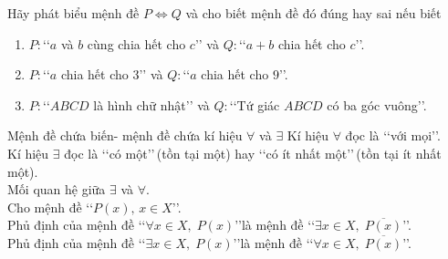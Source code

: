 \begin{bt}
	Hãy phát biểu mệnh đề $P\Leftrightarrow Q$ và cho biết mệnh đề đó đúng hay sai nếu biết
	\begin{enumerate}
		\item $P\colon $\lq\lq $a$ và $b$ cùng chia hết cho $c$\rq\rq\text{} và $Q\colon $\lq\lq $a+b$ chia hết cho $c$\rq\rq.
		\item $P\colon $\lq\lq $a$ chia hết cho $3$\rq\rq\text{} và $Q\colon $\lq\lq $a$ chia hết cho $9$\rq\rq.
		\item $P\colon $\lq\lq $ABCD$ là hình chữ nhật\rq\rq\text{} và $Q\colon $\lq\lq Tứ giác $ABCD$ có ba góc vuông\rq\rq.
	\end{enumerate}
\end{bt}

\begin{dang}{Mệnh đề chứa biến- mệnh đề chứa kí hiệu $\forall$ và $\exists$}
	Kí hiệu $\forall$ đọc là \lq \lq với mọi\rq \rq.\\
	Kí hiệu $\exists$ đọc là \lq \lq có một\rq \rq \,(tồn tại một) hay \lq \lq có ít nhất một\rq \rq\,(tồn tại ít nhất một).\\
	Mối quan hệ giữa $\exists$ và $\forall$.\\
	Cho mệnh đề \lq \lq $P(x),\, x \in X$\rq \rq.\\
	Phủ định của mệnh đề \lq \lq $ \forall x \in X,\;P(x)$\rq \rq \;là mệnh đề \lq \lq $\exists x \in X,\;\overline{P(x)}$\rq \rq.\\
	Phủ định của mệnh đề \lq \lq $ \exists x \in X,\;P(x)$\rq \rq \;là mệnh đề \lq \lq $ \forall x \in X,\;\overline{P(x)}$\rq \rq.
\end{dang}

